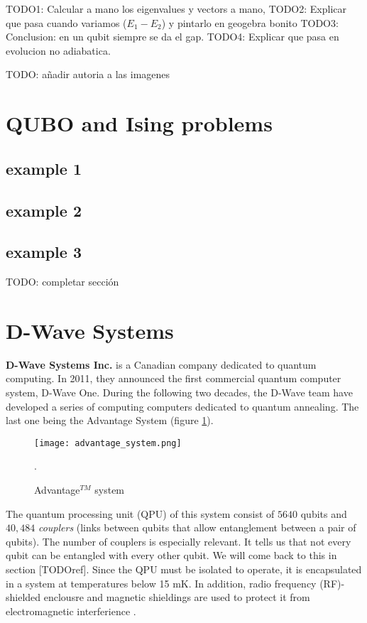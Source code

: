 TODO1: Calcular a mano los eigenvalues y vectors a mano,
TODO2: Explicar que pasa cuando variamos ($E_1 - E_2$) y pintarlo en geogebra bonito
TODO3: Conclusion: en un qubit siempre se da el gap.
TODO4: Explicar que pasa en evolucion no adiabatica.

TODO: añadir autoria a las imagenes


\section{QUBO and Ising problems}

\subsection{example 1}
\subsection{example 2}
\subsection{example 3}

TODO: completar sección





\section{D-Wave Systems}


\textbf{D-Wave Systems Inc.} is a Canadian company dedicated to quantum computing. In 2011, they announced the first commercial quantum computer system, D-Wave One. During the following two decades, the D-Wave team have developed a series of computing computers dedicated to quantum annealing. The last one being the Advantage System (figure \ref{fig 2.2}).

\begin{figure}[h]
	\texttt{[image: advantage\_system.png]}
	\centering
	\caption{Advantage$^{TM}$ system}.
	\label{fig 2.2}
\end{figure}

The quantum processing unit (QPU) of this system consist of $5640$ qubits and $40,484$ \emph{couplers} (links between qubits that allow entanglement between a pair of qubits). The number of couplers is especially relevant. It tells us that not every qubit can be entangled with every other qubit. We will come back to this in section [TODOref]. Since the QPU must be isolated to operate, it is encapsulated in a system at temperatures below 15 mK. In addition, radio frequency (RF)-shielded enclousre and magnetic shieldings are used to protect it from electromagnetic interferience \cite{DWaveDoc}.

